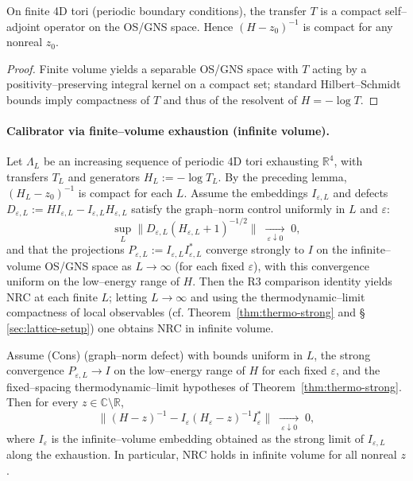 \documentclass[11pt]{amsart}
\begin{document}
\begin{lemma}
On finite 4D tori (periodic boundary conditions), the transfer $T$ is a compact self–adjoint operator on the OS/GNS space. Hence $(H-z_0)^{-1}$ is compact for any nonreal $z_0$.
\end{lemma}

\begin{proof}
Finite volume yields a separable OS/GNS space with $T$ acting by a positivity–preserving integral kernel on a compact set; standard Hilbert–Schmidt bounds imply compactness of $T$ and thus of the resolvent of $H=-\log T$.
\end{proof}

\paragraph{Calibrator via finite–volume exhaustion (infinite volume).}
Let $\Lambda_L$ be an increasing sequence of periodic 4D tori exhausting $\mathbb R^4$, with transfers $T_L$ and generators $H_L:=-\log T_L$. By the preceding lemma, $(H_L-z_0)^{-1}$ is compact for each $L$. Assume the embeddings $I_{\varepsilon,L}$ and defects $D_{\varepsilon,L}:=H I_{\varepsilon,L}-I_{\varepsilon,L} H_{\varepsilon,L}$ satisfy the graph–norm control uniformly in $L$ and $\varepsilon$:
\[
  \sup_L\big\| D_{\varepsilon,L} (H_{\varepsilon,L}+1)^{-1/2}\big\|\;\xrightarrow[\ \varepsilon\downarrow 0\ ]{}\;0,
\]
and that the projections $P_{\varepsilon,L}:=I_{\varepsilon,L} I_{\varepsilon,L}^*$ converge strongly to $I$ on the infinite–volume OS/GNS space as $L\to\infty$ (for each fixed $\varepsilon$), with this convergence uniform on the low–energy range of $H$. Then the R3 comparison identity yields NRC at each finite $L$; letting $L\to\infty$ and using the thermodynamic–limit compactness of local observables (cf. Theorem~\ref{thm:thermo-strong} and \S\,\ref{sec:lattice-setup}) one obtains NRC in infinite volume.

\begin{theorem}
Assume (Cons) (graph–norm defect) with bounds uniform in $L$, the strong convergence $P_{\varepsilon,L}\to I$ on the low–energy range of $H$ for each fixed $\varepsilon$, and the fixed–spacing thermodynamic–limit hypotheses of Theorem~\ref{thm:thermo-strong}. Then for every $z\in\mathbb C\setminus\mathbb R$,
\[
  \big\|(H-z)^{-1}-I_{\varepsilon}(H_{\varepsilon}-z)^{-1}I_{\varepsilon}^*\big\|\;\xrightarrow[\ \varepsilon\downarrow 0\ ]{}\;0,
\]
where $I_{\varepsilon}$ is the infinite–volume embedding obtained as the strong limit of $I_{\varepsilon,L}$ along the exhaustion. In particular, NRC holds in infinite volume for all nonreal $z$.
\end{theorem}
\end{document}
